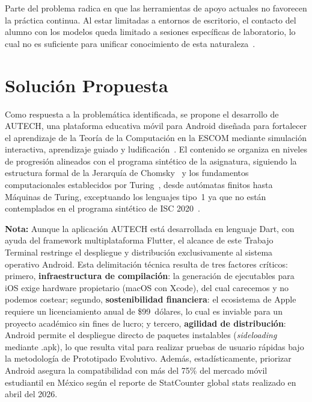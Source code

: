 Parte del problema radica en que las herramientas de apoyo actuales no favorecen la práctica
continua. Al estar limitadas a entornos de escritorio, el contacto del alumno con los modelos
queda limitado a sesiones específicas de laboratorio, lo cual no es suficiente para unificar
conocimiento de esta naturaleza~\cite{escom2016, nielsen1994}.

\section{Solución Propuesta}
\label{sec:solucion}

Como respuesta a la problemática identificada, se propone el desarrollo de AUTECH, una
plataforma educativa móvil para Android diseñada para fortalecer el aprendizaje de la Teoría
de la Computación en la ESCOM mediante simulación interactiva, aprendizaje guiado y
ludificación~\cite{deterding2011}. El contenido se organiza en niveles de progresión alineados
con el programa sintético de la asignatura, siguiendo la estructura formal de la Jerarquía de
Chomsky~\cite{church1936} y los fundamentos computacionales establecidos por
Turing~\cite{turing1936}, desde autómatas finitos hasta Máquinas de Turing, exceptuando
los lenguajes tipo~1 ya que no están contemplados en el programa sintético de
ISC 2020~\cite{ipn2020, hopcroft2007}.

\begin{infobox}
\textbf{Nota:} Aunque la aplicación AUTECH está desarrollada en lenguaje Dart, con ayuda del
framework multiplataforma Flutter, el alcance de este Trabajo Terminal restringe el despliegue
y distribución exclusivamente al sistema operativo Android. Esta delimitación técnica resulta
de tres factores críticos: primero, \textbf{infraestructura de compilación}: la generación de
ejecutables para iOS exige hardware propietario (macOS con Xcode), del cual carecemos y no
podemos costear; segundo, \textbf{sostenibilidad financiera}: el ecosistema de Apple requiere
un licenciamiento anual de \$99~dólares, lo cual es inviable para un proyecto académico sin
fines de lucro; y tercero, \textbf{agilidad de distribución}: Android permite el despliegue
directo de paquetes instalables (\textit{sideloading} mediante .apk), lo que resulta vital
para realizar pruebas de usuario rápidas bajo la metodología de Prototipado Evolutivo. Además,
estadísticamente, priorizar Android asegura la compatibilidad con más del 75\% del mercado
móvil estudiantil en México según el reporte de StatCounter global stats realizado en abril
del 2026.
\end{infobox}


